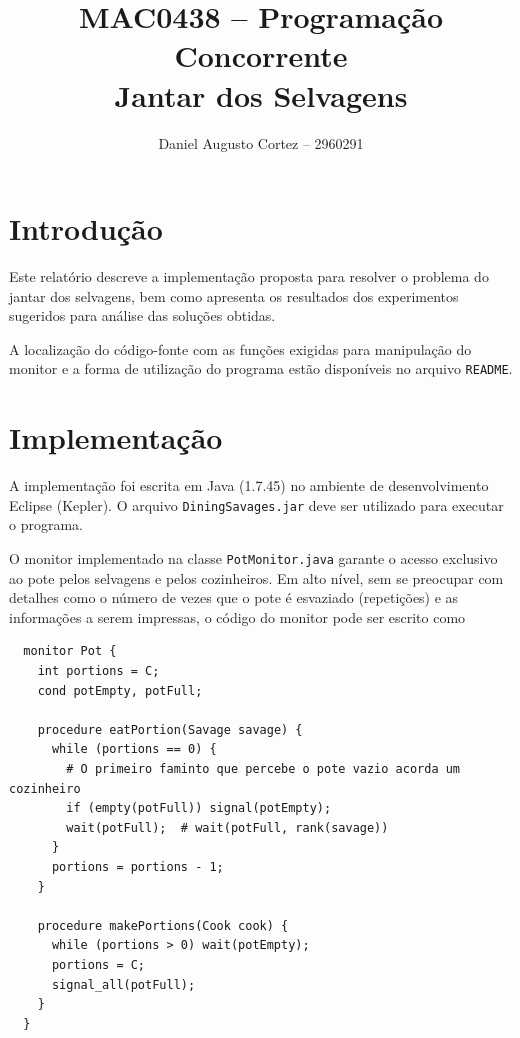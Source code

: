 \documentclass[11pt,a4paper]{article}
\newcommand{\zerar}{\setcounter{equation}{0}\setcounter{figure}{0}\setcounter{table}{0}}
\begin{document}
\title{
  {\sc MAC0438 -- Programação Concorrente} \\ 
  \vspace{0.5cm} 
  {\bf Jantar dos Selvagens}
}
\author{Daniel Augusto Cortez -- 2960291}
\date{}
\maketitle


\zerar
\section{Introdução}
\label{sec:intro}

Este relatório descreve a implementação proposta para resolver o problema do jantar dos selvagens, 
bem como apresenta os resultados dos experimentos sugeridos para análise das soluções obtidas. 

A localização do código-fonte com as funções exigidas para manipulação do monitor e a forma de 
utilização do programa estão disponíveis no arquivo \verb|README|.


\zerar
\section{Implementação}
\label{sec:imp}

A implementação foi escrita em Java (1.7.45) no ambiente de desenvolvimento Eclipse (Kepler). O 
arquivo \verb|DiningSavages.jar| deve ser utilizado para executar o programa.

O monitor implementado na classe \verb|PotMonitor.java| garante o acesso exclusivo ao pote pelos
selvagens e pelos cozinheiros. Em alto nível, sem se preocupar com detalhes como o número de vezes 
que o pote é esvaziado (repetições) e as informações a serem impressas, o código do monitor pode ser 
escrito como 

\begin{verbatim}
  monitor Pot {
    int portions = C;
    cond potEmpty, potFull;

    procedure eatPortion(Savage savage) {
      while (portions == 0) {
        # O primeiro faminto que percebe o pote vazio acorda um cozinheiro
        if (empty(potFull)) signal(potEmpty);
        wait(potFull);  # wait(potFull, rank(savage)) 
      }
      portions = portions - 1;
    }

    procedure makePortions(Cook cook) {
      while (portions > 0) wait(potEmpty);
      portions = C;
      signal_all(potFull);
    }
  }
\end{verbatim}
\end{document}
